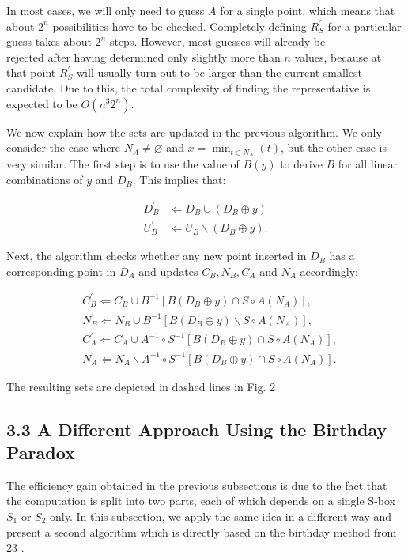 \documentclass[10pt]{article}
\begin{document}
In most cases, we will only need to guess $A$ for a single point, which means that about $2^{n}$ possibilities have to be checked. Completely defining $R_{S}^{\prime}$ for a particular guess takes about $2^{n}$ steps. However, most guesses will already be\\
rejected after having determined only slightly more than $n$ values, because at that point $R_{S}^{\prime}$ will usually turn out to be larger than the current smallest candidate. Due to this, the total complexity of finding the representative is expected to be $O\left(n^{3} 2^{n}\right)$.

We now explain how the sets are updated in the previous algorithm. We only consider the case where $N_{A} \neq \varnothing$ and $x=\min _{t \in N_{A}}(t)$, but the other case is very similar. The first step is to use the value of $B(y)$ to derive $B$ for all linear combinations of $y$ and $D_{B}$. This implies that:


\begin{align*}
D_{B}^{\prime} & \Leftarrow D_{B} \cup\left(D_{B} \oplus y\right)  \tag{3}\\
U_{B}^{\prime} & \Leftarrow U_{B} \backslash\left(D_{B} \oplus y\right) . \tag{4}
\end{align*}


Next, the algorithm checks whether any new point inserted in $D_{B}$ has a corresponding point in $D_{A}$ and updates $C_{B}, N_{B}, C_{A}$ and $N_{A}$ accordingly:


\begin{align*}
& C_{B}^{\prime} \Leftarrow C_{B} \cup B^{-1}\left[B\left(D_{B} \oplus y\right) \cap S \circ A\left(N_{A}\right)\right],  \tag{5}\\
& N_{B}^{\prime} \Leftarrow N_{B} \cup B^{-1}\left[B\left(D_{B} \oplus y\right) \backslash S \circ A\left(N_{A}\right)\right],  \tag{6}\\
& C_{A}^{\prime} \Leftarrow C_{A} \cup A^{-1} \circ S^{-1}\left[B\left(D_{B} \oplus y\right) \cap S \circ A\left(N_{A}\right)\right],  \tag{7}\\
& N_{A}^{\prime} \Leftarrow N_{A} \backslash A^{-1} \circ S^{-1}\left[B\left(D_{B} \oplus y\right) \cap S \circ A\left(N_{A}\right)\right] . \tag{8}
\end{align*}


The resulting sets are depicted in dashed lines in Fig. 2

\subsection*{3.3 A Different Approach Using the Birthday Paradox}
The efficiency gain obtained in the previous subsections is due to the fact that the computation is split into two parts, each of which depends on a single S-box $S_{1}$ or $S_{2}$ only. In this subsection, we apply the same idea in a different way and present a second algorithm which is directly based on the birthday method from 23 .
\end{document}
